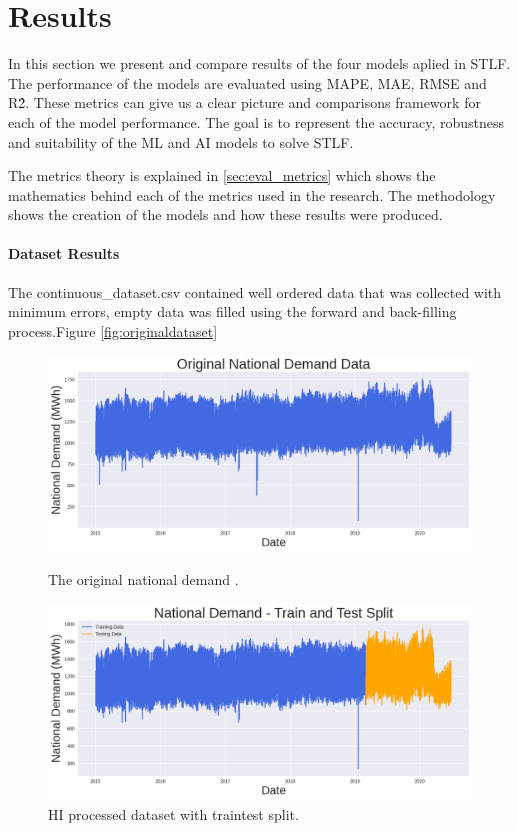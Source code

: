 \chapter{Results}
In this section we present and compare results of the four models aplied in STLF. The performance of the models are evaluated using MAPE, MAE, RMSE and R\^2. These metrics can give us a clear picture and comparisons framework for each of the model performance.  The goal is to represent the accuracy, robustness and suitability of the ML and AI models to solve STLF.

The metrics theory is explained in \ref{sec:eval_metrics} which shows the mathematics behind each of the metrics used in the research. The methodology shows the creation of the models and how these results were produced. 


\subsubsection{Dataset Results}
 The continuous\_dataset.csv contained well ordered data that was collected with minimum errors, empty data was filled using the forward and back-filling process.Figure \ref{fig:originaldataset}
 \begin{figure}[h]
 	\centering
 \begin{minipage}[b]{0.45\linewidth}
 	\centering
 	\includegraphics[width=\linewidth]{Chapters/images/results/original_dataset}
 	\caption{The original national demand .}
 	\label{fig:originaldataset}
 \end{minipage}
 \begin{minipage}[b]{0.45\linewidth}
 	\centering
 	\includegraphics[width=\linewidth]{"Chapters/images/results/train test split_after HI"}
 	\caption{HI processed dataset with traintest split.}
 	\label{fig:train-test-splitafter-hi}
 \end{minipage}
 \end{figure}
 
